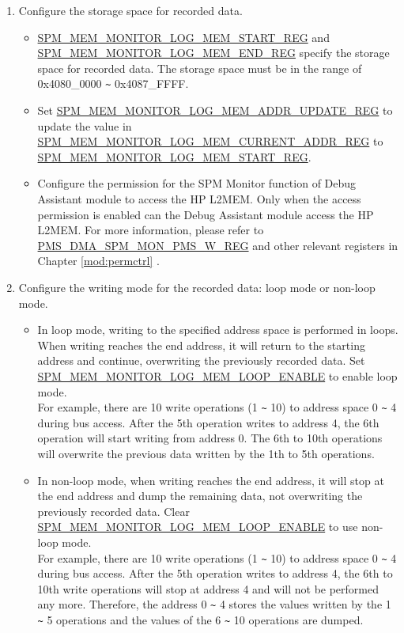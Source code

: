 \documentclass[main\_\_EN.tex]{subfiles}
\begin{document}
\begin{enumerate}
\item Configure the storage space for recorded data.
        \begin{itemize}
            \item \hyperref[regdesc:SPMMEMMONITORLOGMEMSTARTREG]{SPM\_MEM\_MONITOR\_LOG\_MEM\_START\_REG} and \hyperref[regdesc:SPMMEMMONITORLOGMEMENDREG]{SPM\_MEM\_MONITOR\_LOG\_MEM\_END\_REG} specify the storage space for recorded data. The storage space must be in the range of 0x4080\_0000 \verb+~+ 0x4087\_FFFF.
            \item Set \hyperref[regdesc:SPMMEMMONITORLOGMEMADDRUPDATEREG]{SPM\_MEM\_MONITOR\_LOG\_MEM\_ADDR\_UPDATE\_REG} to update the value in \hyperref[regdesc:SPMMEMMONITORLOGMEMCURRENTADDRREG]{SPM\_MEM\_MONITOR\_LOG\_MEM\_CURRENT\_ADDR\_REG} to \hyperref[regdesc:SPMMEMMONITORLOGMEMSTARTREG]{SPM\_MEM\_MONITOR\_LOG\_MEM\_START\_REG}.
            \item Configure the permission for the SPM Monitor function of Debug Assistant module to access the HP L2MEM. Only when the access permission is enabled can the Debug Assistant module access the HP L2MEM. For more information, please refer to \hyperref[regdesc:PMSDMASPMMONPMSWREG]{PMS\_DMA\_SPM\_MON\_PMS\_W\_REG} and other relevant registers in Chapter \ref{mod:permctrl} \textit{}.
        \end{itemize}

\item \label{other:dbgassist-item-log-config-step5} Configure the writing mode for the recorded data: loop mode or non-loop mode.
        \begin{itemize}
            \item In loop mode, writing to the specified address space is performed in loops. When writing reaches the end address, it will return to the starting address and continue, overwriting the previously recorded data. Set \hyperref[fielddesc:SPMMEMMONITORLOGMEMLOOPENABLE]{SPM\_MEM\_MONITOR\_LOG\_MEM\_LOOP\_ENABLE} to enable loop mode.\\
            For example, there are 10 write operations (1 \verb+~+ 10) to address space 0 \verb+~+ 4 during bus access. After the 5th operation writes to address 4, the 6th operation will start writing from address 0. The 6th to 10th operations will overwrite the previous data written by the 1th to 5th operations.
            \item In non-loop mode, when writing reaches the end address, it will stop at the end address and dump the remaining data, not overwriting the previously recorded data. Clear \hyperref[fielddesc:SPMMEMMONITORLOGMEMLOOPENABLE]{SPM\_MEM\_MONITOR\_LOG\_MEM\_LOOP\_ENABLE} to use non-loop mode.\\
            For example, there are 10 write operations (1 \verb+~+ 10) to address space 0 \verb+~+ 4 during bus access. After the 5th operation writes to address 4, the 6th to 10th write operations will stop at address 4 and will not be performed any more. Therefore, the address 0 \verb+~+ 4 stores the values written by the 1 \verb+~+ 5 operations and the values of the 6 \verb+~+ 10 operations are dumped.
        \end{itemize}


\end{enumerate}
\end{document}
